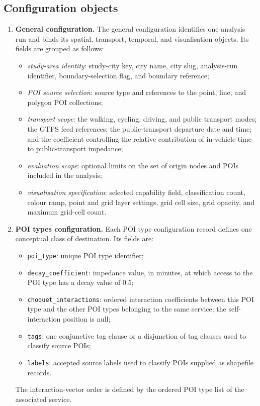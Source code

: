 \subsection*{Configuration objects}
\begin{enumerate}
    \item \textbf{General configuration.}
    The general configuration identifies one analysis run and binds its spatial,
    transport, temporal, and visualisation objects. Its fields are grouped as
    follows:
    \begin{itemize}
        \item \emph{study-area identity}: study-city key, city name, city slug,
        analysis-run identifier, boundary-selection flag, and boundary
        reference;
        \item \emph{POI source selection}: source type and references to the
        point, line, and polygon POI collections;
        \item \emph{transport scope}: the walking, cycling, driving, and public
        transport modes; the GTFS feed references; the public-transport
        departure date and time; and the coefficient controlling the relative
        contribution of in-vehicle time to public-transport impedance;
        \item \emph{evaluation scope}: optional limits on the set of origin
        nodes and POIs included in the analysis;
        \item \emph{visualisation specification}: selected capability field,
        classification count, colour ramp, point and grid layer settings, grid
        cell size, grid opacity, and maximum grid-cell count.
    \end{itemize}

    \item \textbf{POI types configuration.}
    Each POI type configuration record defines one conceptual class of
    destination. Its fields are:
    \begin{itemize}
        \item \texttt{poi\_type}: unique POI type identifier;
        \item \texttt{decay\_coefficient}: impedance value, in minutes, at
        which access to the POI type has a decay value of \(0.5\);
        \item \texttt{choquet\_interactions}: ordered interaction coefficients
        between this POI type and the other POI types belonging to the same
        service; the self-interaction position is null;
        \item \texttt{tags}: one conjunctive tag clause or a disjunction of tag
        clauses used to classify source POIs;
        \item \texttt{labels}: accepted source labels used to classify POIs
        supplied as shapefile records.
    \end{itemize}
    The interaction-vector order is defined by the ordered POI type list of the
    associated service.


\end{enumerate}
